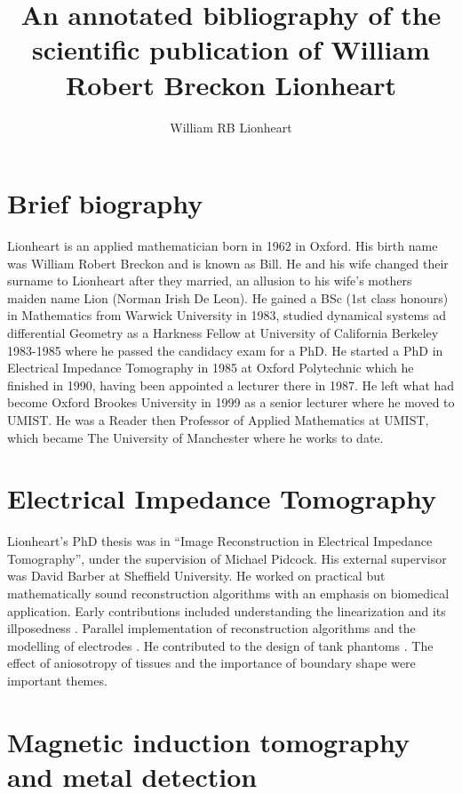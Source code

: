 \documentclass[]{article}
\title{An annotated bibliography of the  scientific publication of William Robert Breckon Lionheart}
\author{William RB Lionheart}
\begin{document}
\maketitle


\section{Brief biography}
Lionheart is an applied mathematician born in 1962 in Oxford. His birth name was William Robert Breckon and is known as Bill. He and his wife changed their surname to Lionheart after they married, an allusion to his wife's mothers maiden name Lion (Norman Irish De Leon).  He gained a BSc (1st class honours) in Mathematics from Warwick University in 1983, studied dynamical systems ad differential Geometry as a Harkness Fellow at University of California Berkeley 1983-1985 where he passed the candidacy exam for a PhD. He started a PhD in Electrical Impedance Tomography in 1985 at Oxford Polytechnic which he finished in 1990, having been appointed a lecturer there in 1987.  He left what had become Oxford Brookes University in 1999 as a senior lecturer where he moved to UMIST. He was a Reader then Professor of Applied Mathematics at UMIST, which became The University of Manchester where he works to date.

\section{Electrical Impedance Tomography}

Lionheart's PhD thesis was in ``Image Reconstruction in Electrical Impedance Tomography''\cite{breckon1990image}, under the supervision of Michael Pidcock. His external supervisor was David Barber at Sheffield University. He worked on practical but mathematically sound reconstruction algorithms with an emphasis on biomedical application. Early contributions included understanding the linearization and its illposedness \cite{breckon1988ill} \cite{breckon1988progress} \cite{breckon1988data}. Parallel implementation of reconstruction algorithms \cite{breckon1990parallelism} and the modelling of electrodes \cite{paulson1992electrode}. He contributed to the design of tank phantoms \cite{paulson1992hybrid}. The effect of  aniosotropy of tissues \cite{breckon1992problem}  and the importance of boundary shape were important themes. 


\section{Magnetic induction tomography and metal detection}
\end{document}
